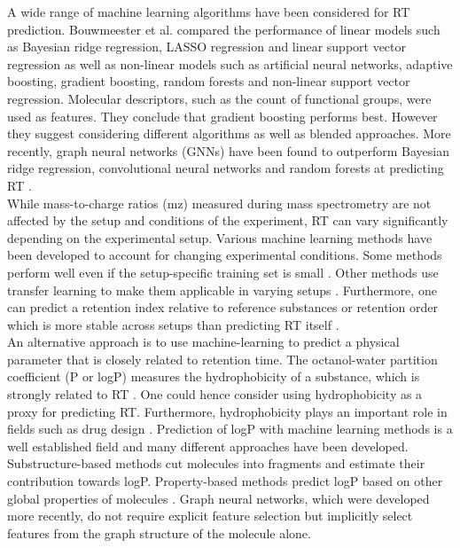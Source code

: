 \documentclass{article}
\begin{document}
A wide range of machine learning algorithms have been considered for RT prediction. Bouwmeester et al. \cite{bouwmeester2019comprehensive} compared the performance of linear models such as Bayesian ridge regression, LASSO regression and linear support vector regression as well as non-linear models such as artificial neural networks, adaptive boosting, gradient boosting, random forests and non-linear support vector regression. Molecular descriptors, such as the count of functional groups, were used as features. They conclude that gradient boosting performs best. However they suggest considering different algorithms as well as blended approaches. More recently, graph neural networks (GNNs) have been found to outperform Bayesian ridge regression, convolutional neural networks and random forests at predicting RT \cite{yang2021prediction}.\\

While mass-to-charge ratios (mz) measured during mass spectrometry are not affected by the setup and conditions of the experiment, RT can vary significantly depending on the experimental setup. Various machine learning methods have been developed to account for changing experimental conditions. Some methods perform well even if the setup-specific training set is small \cite{bouwmeester2019comprehensive}. Other methods use transfer learning to make them applicable in varying setups \cite{yang2021prediction}. Furthermore, one can predict a retention index relative to reference substances or retention order which is more stable across setups than predicting RT itself \cite{qu2021predicting}.\\

An alternative approach is to use machine-learning to predict a physical parameter that is closely related to retention time. The octanol-water partition coefficient (P or logP) measures the hydrophobicity of a substance, which is strongly related to RT \cite{bouwmeester2019comprehensive}. One could hence consider using hydrophobicity as a proxy for predicting RT. Furthermore, hydrophobicity plays an important role in fields such as drug design \cite{tetko2004application}. Prediction of logP with machine learning methods is a well established field and many different approaches have been developed. Substructure-based methods cut molecules into fragments and estimate their contribution towards logP. Property-based methods predict logP based on other global properties of molecules \cite{mannhold2009calculation}. Graph neural networks, which were developed more recently, do not require explicit feature selection but implicitly select features from the graph structure of the molecule alone.\\
\end{document}

